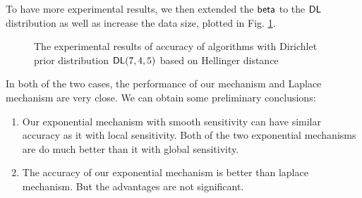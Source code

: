 To have more experimental results, we then extended the $\mathsf{beta}$ to the $\mathsf{DL}$ distribution as well as increase the data size, plotted in Fig. \ref{fig_dirichlet_hellinger}.
\begin{figure}
\begin{center}
\centering
\caption{The experimental results of accuracy of algorithms with Dirichlet prior distribution $\mathsf{DL}(7, 4, 5)$ based on Hellinger distance}
\label{fig_dirichlet_hellinger}
\end{center}
\end{figure}

In both of the two cases, the performance of our mechanism and Laplace mechanism are very close. We can obtain some preliminary conclusions: 
\begin{enumerate}
	\item Our exponential mechanism with smooth sensitivity can have similar accuracy as it with local sensitivity. Both of the two exponential mechanisms are do much better than it with global sensitivity.
	\item The accuracy of our exponential mechanism is better than laplace mechanism. But the advantages are not significant.
\end{enumerate} 

